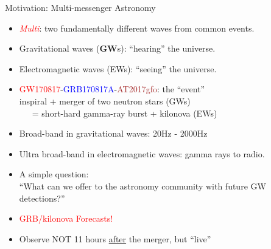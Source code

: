 \documentclass[xcolor=dvipsnames,t]{beamer}
\newcommand{\red}[1]{\textcolor{red}{#1}}
\newcommand{\bl}[1]{\textcolor{blue}{#1}}
\begin{document}
\begin{frame}{Motivation: Multi-messenger Astronomy}
  \begin{itemize}
    \item \red{\emph{Multi}}: two fundamentally different waves from common events.
    \item[]\quad Gravitational waves ({\bf GW}s): ``hearing''  the universe.
    \item[]\quad Electromagnetic waves (EWs): ``seeing'' the universe.
    \item \red{GW170817}-\bl{GRB170817A}-\textcolor{brown}{AT2017gfo}: the ``event'' \\
    \quad inspiral + merger of two neutron stars (GWs) \\
    \ \ \ = short-hard gamma-ray burst + kilonova (EWs)
    \item[] Broad-band in gravitational waves: 20Hz - 2000Hz
    \item[] Ultra broad-band in electromagnetic waves: gamma rays to radio.
    \item A simple question: \\
    {\small ``What can we offer to the astronomy community with future GW detections?''}
    \item[] \red{GRB/kilonova Forecasts!}
    \item[] Observe NOT 11 hours \underline{after} the merger, but ``live''
  \end{itemize}
\end{frame}
\end{document}
